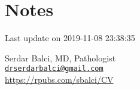 \documentclass[]{article}
\begin{document}
\pagebreak

\hypertarget{notes}{%
\section{Notes}\label{notes}}

Last update on 2019-11-08 23:38:35

Serdar Balci, MD, Pathologist\\
\href{mailto:drserdarbalci@gmail.com}{\nolinkurl{drserdarbalci@gmail.com}}\\
\url{https://rpubs.com/sbalci/CV}

\pagebreak

\newpage
\end{document}
